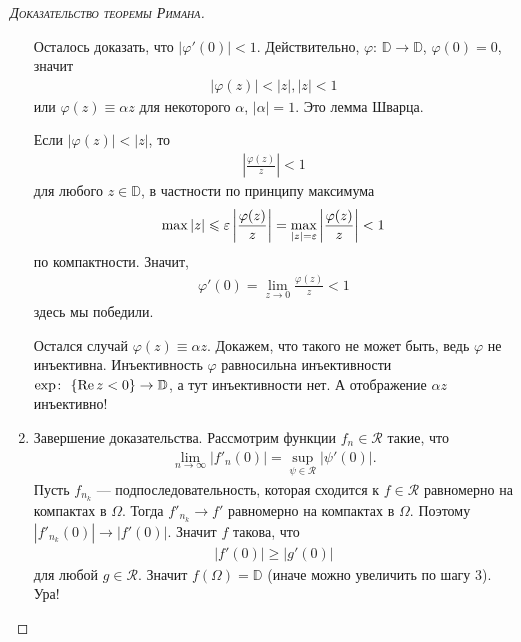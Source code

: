 \documentclass[../complex-analysis.tex]{subfiles}
\begin{document}
\begin{proof}[\normalfont\textsc{Доказательство теоремы Римана}]
\begin{enumerate}
   Осталось доказать, что $ \left| \varphi'(0) \right| < 1 $. Действительно, $ \varphi\colon\,\mathbb D \to \mathbb D $, $ \varphi(0) = 0 $, значит
   \begin{align*}
    \left| \varphi(z) \right| < \left| z \right|, \left| z \right| < 1
   \end{align*} или $ \varphi(z) \equiv \alpha z $ для некоторого $ \alpha $, $ \left| \alpha \right| = 1 $. Это лемма Шварца.

   Если $ \left| \varphi(z) \right| < \left| z \right| $, то
   \begin{align*}
    \left| \frac{\varphi(z)}{z} \right| < 1
   \end{align*} для любого $ z \in \mathbb D $, в частности по принципу максимума
   \begin{align*}
    \max{\left| z \right| \leqslant \ensuremath \varepsilon} \left| \frac{\varphi(z)}{z} \right| = \max_{\left| z \right| = \varepsilon} \left| \frac{\varphi(z)}{z} \right| < 1
   \end{align*} по компактности. Значит,
   \begin{align*}
    \varphi'(0) = \lim_{z \to 0} \frac{\varphi(z)}{z} < 1
   \end{align*} здесь мы победили.

   Остался случай $ \varphi(z) \equiv \alpha z $. Докажем, что такого не может быть, ведь $ \varphi $ не инъективна. Инъективность $ \varphi $ равносильна инъективности $ \exp \colon\, \left\{ \operatorname{Re} z < 0 \right\} \to \mathbb D $, а тут инъективности нет. А отображение $ \alpha z $ инъективно!

  \item Завершение доказательства. Рассмотрим функции $ f_n \in \mathcal R $ такие, что
   \begin{align*}
    \lim_{n \to \infty} \left| f'_n(0) \right| = \sup_{\psi \in \mathcal R} \left| \psi'(0) \right|.
   \end{align*} Пусть $ f_{n_k} $ --- подпоследовательность, которая сходится к $ f \in \mathcal R $ равномерно на компактах в $ \Omega $. Тогда $ f'_{n_k} \to f' $ равномерно на компактах в $ \Omega $. Поэтому $ \left| f'_{n_k}(0) \right| \to \left| f'(0) \right| $. Значит $ f $ такова, что
   \begin{align*}
    \left| f'(0) \right| \geqslant \left| g'(0) \right|
   \end{align*} для любой $ g \in \mathcal R $. Значит $ f(\Omega) = \mathbb D $ (иначе можно увеличить по шагу 3). Ура!
 \end{enumerate}
\end{proof}
\end{document}
